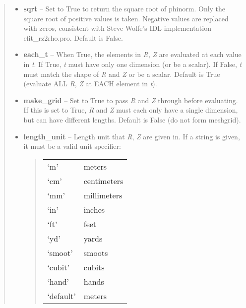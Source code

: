 \documentclass[letterpaper,10pt,english]{sphinxmanual}
\begin{document}
\begin{fulllineitems}
\begin{fulllineitems}
\begin{quote}
\begin{description}
\begin{itemize}
\item {} 
\textbf{sqrt} -- Set to True to return the square root of phinorm.
Only the square root of positive values is taken. Negative
values are replaced with zeros, consistent with Steve Wolfe's
IDL implementation efit\_rz2rho.pro. Default is False.

\item {} 
\textbf{each\_t} -- When True, the elements in \emph{R}, \emph{Z} are evaluated
at each value in \emph{t}. If True, \emph{t} must have only one dimension
(or be a scalar). If False, \emph{t} must match the shape of \emph{R} and
\emph{Z} or be a scalar. Default is True (evaluate ALL \emph{R}, \emph{Z} at
EACH element in \emph{t}).

\item {} 
\textbf{make\_grid} -- Set to True to pass \emph{R} and \emph{Z} through
 before evaluating. If this is set to
True, \emph{R} and \emph{Z} must each only have a single dimension, but
can have different lengths. Default is False (do not form
meshgrid).

\item {} 
\textbf{length\_unit} -- 
Length unit that \emph{R}, \emph{Z} are given in.
If a string is given, it must be a valid unit specifier:
\begin{quote}

\begin{tabulary}{\linewidth}{|L|L|}
\hline

`m'
 & 
meters
\\

`cm'
 & 
centimeters
\\

`mm'
 & 
millimeters
\\

`in'
 & 
inches
\\

`ft'
 & 
feet
\\

`yd'
 & 
yards
\\

`smoot'
 & 
smoots
\\

`cubit'
 & 
cubits
\\

`hand'
 & 
hands
\\

`default'
 & 
meters
\\
\hline\end{tabulary}


\end{quote}
\end{itemize}
\end{description}
\end{quote}
\end{fulllineitems}
\end{fulllineitems}
\end{document}
